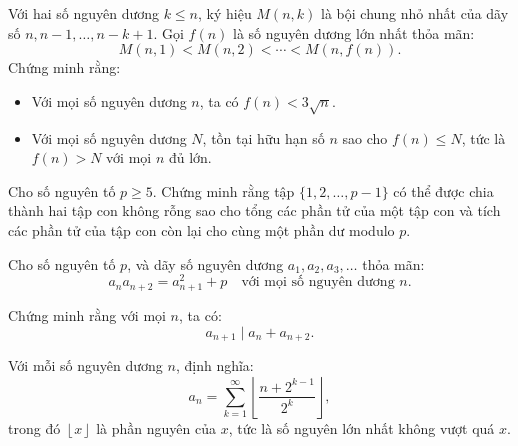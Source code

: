 \documentclass[./m.tex]{subfiles}
\begin{document}
\begin{problem}\label{problem:ROU-2015-TST-D3-P3}
    Với hai số nguyên dương \( k \leq n \), ký hiệu \( M(n,k) \) là bội chung nhỏ nhất của dãy số \( n, n-1, \dots, n - k + 1 \).  
    Gọi \( f(n) \) là số nguyên dương lớn nhất thỏa mãn:
    \[
        M(n,1) < M(n,2) < \cdots < M(n,f(n)).
    \]
    Chứng minh rằng:
    \begin{itemize}[topsep=0pt, partopsep=0pt, itemsep=0pt]
        \item Với mọi số nguyên dương \( n \), ta có \( f(n) < 3\sqrt{n} \).
        \item Với mọi số nguyên dương \( N \), tồn tại hữu hạn số \( n \) sao cho \( f(n) \leq N \), tức là \( f(n) > N \) với mọi \( n \) đủ lớn.
    \end{itemize}    
\end{problem}

\begin{problem}\label{problem:RUS-2015-TST-D10-P2}
	Cho số nguyên tố \( p \ge 5 \). Chứng minh rằng tập \( \{1,2,\ldots,p - 1\} \) có thể được chia thành hai tập con không rỗng
	sao cho tổng các phần tử của một tập con và tích các phần tử của tập con còn lại cho cùng một phần dư modulo \( p \).	
\end{problem}

\begin{problem}\label{problem:THA-2015-MO-P1}
	Cho số nguyên tố \( p \), và dãy số nguyên dương \( a_1, a_2, a_3, \dots \) thỏa mãn:
	\[
		a_n a_{n+2} = a_{n+1}^2 + p \quad \text{với mọi số nguyên dương } n.
	\]
	
	Chứng minh rằng với mọi \( n \), ta có:
	\[
		a_{n+1} \mid a_n + a_{n+2}.
	\]
\end{problem}

\begin{problem}\label{problem:TWN-2015-TST2-Q2-P1}
    Với mỗi số nguyên dương \( n \), định nghĩa:
    \[
        a_n = \sum_{k=1}^{\infty} \left\lfloor \frac{n + 2^{k-1}}{2^k} \right\rfloor,
    \]
    trong đó \( \left\lfloor x \right\rfloor \) là phần nguyên của \( x \), tức là số nguyên lớn nhất không vượt quá \( x \).
\end{problem}
\end{document}
